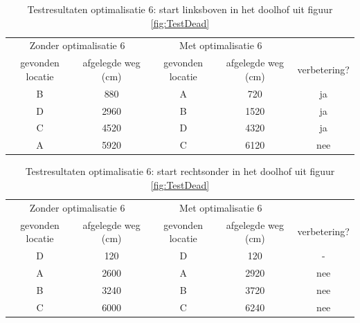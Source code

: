 \documentclass[eind]{penoverslag}
\begin{document}
\begin{table}[h]
\begin{center}
    \begin{tabular}{ c | c | c | c | c}
   \multicolumn{2}{c|}{Zonder optimalisatie 6} & \multicolumn{2}{|c|}{Met optimalisatie 6} & \\
     gevonden locatie & afgelegde weg (cm) & gevonden locatie &  afgelegde weg (cm) & verbetering?\\ \hline\hline
    B & 880 & A & 720 & ja \\ \hline
    D & 2960 & B & 1520 & ja \\ \hline
    C & 4520 & D & 4320 & ja\\ \hline
    A & 5920 & C & 6120 & nee\\
    \end{tabular}
    \caption{Testresultaten optimalisatie 6: start linksboven in het doolhof uit figuur \ref{fig:TestDead}}
    \label{tab:resultVerken1}
\end{center}
\end{table}

\begin{table}[h]
\begin{center}
    \begin{tabular}{c | c | c | c | c}
   \multicolumn{2}{c|}{Zonder optimalisatie 6} & \multicolumn{2}{|c|}{Met optimalisatie 6} &\\
     gevonden locatie &  afgelegde weg (cm) & gevonden locatie &  afgelegde weg (cm)& verbetering?\\ \hline\hline
    D & 120 & D & 120 & -\\ \hline
    A & 2600 & A & 2920 & nee\\ \hline
    B & 3240 & B & 3720 & nee\\ \hline
    C & 6000 & C & 6240 & nee\\
    \end{tabular}
    \caption{Testresultaten optimalisatie 6: start rechtsonder in het doolhof uit figuur \ref{fig:TestDead}}
    \label{tab:resultVerken2}
\end{center}
\end{table}
\end{document}
